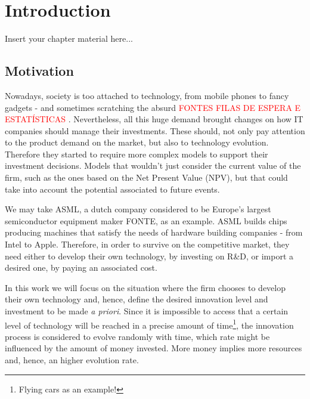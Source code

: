 
\chapter{Introduction}
\label{chapter:introduction}

Insert your chapter material here...

\section{Motivation}
\label{section:motivation}

Nowadays, society is too attached to technology, from mobile phones to fancy gadgets - and sometimes scratching the absurd \textcolor{red}{FONTES FILAS DE ESPERA E ESTATÍSTICAS} . Nevertheless, all this huge demand brought changes on how IT companies should manage their investments. These should, not only pay attention to the product demand on the market, but also to technology evolution. Therefore they started to require more complex models to support their investment decisions. Models that wouldn't just consider the current value of the firm, such as the ones based on the Net Present Value (NPV), but that could take into account the potential associated to future events.

We may take ASML, a dutch company considered to be Europe's largest semiconductor equipment maker FONTE, as an example.
ASML builds chips producing machines that satisfy the needs of hardware building companies - from Intel to Apple.
Therefore, in order to survive on the competitive market, they need either to develop their own technology, by investing on R\&D, or import a desired one, by paying an associated cost.

In this work we will focus on the situation where the firm chooses to develop their own technology and, hence, define the desired innovation level and investment to be made \textit{a priori}. Since it is impossible to access that a certain level of technology will be reached in a precise amount of time\footnote{Flying cars as an example!}, the innovation process is considered to evolve randomly with time, which rate might be influenced by the amount of money invested. More money implies more resources and, hence, an higher evolution rate.

